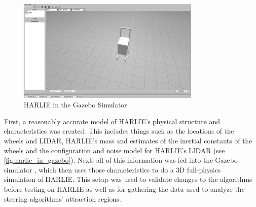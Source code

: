 \begin{figure}
\centering
\includegraphics[width=0.80\textwidth]{images/harlie_in_gazebo}
\caption{HARLIE in the Gazebo Simulator \label{fig:harlie_in_gazebo}}
\end{figure}

First, a reasonably accurate model of HARLIE's physical structure and characteristics was created. This includes things such as the locations of the wheels and LIDAR, HARLIE's mass and estimates of the inertial constants of the wheels and the configuration and noise model for HARLIE's LIDAR (see \autoref{fig:harlie_in_gazebo}). Next, all of this information was fed into the Gazebo simulator \autocite{Koenig04designand}, which then uses those characteristics to do a 3D full-physics simulation of HARLIE. This setup was used to validate changes to the algorithms before testing on HARLIE as well as for gathering the data used to analyze the steering algorithms' attraction regions.

